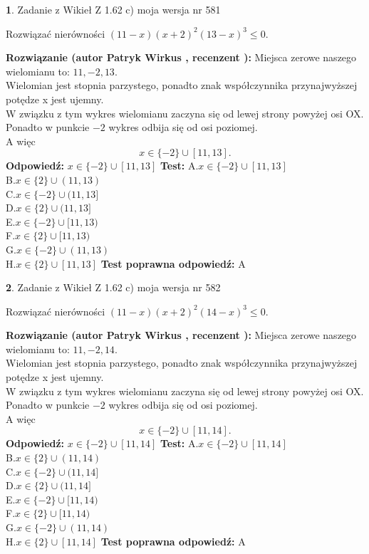 \documentclass[12pt, a4paper]{article}
\theoremstyle{definition} %
\newtheorem{zad}{}
\newcommand{\zadStart}[1]{\begin{zad}#1\newline}
\newcommand{\zadStop}{\end{zad}}
\newcommand{\rozwStart}[2]{\noindent \textbf{Rozwiązanie (autor #1 , recenzent #2): }\newline}
\newcommand{\rozwStop}{\newline}
\newcommand{\odpStart}{\noindent \textbf{Odpowiedź:}\newline}
\newcommand{\odpStop}{\newline}
\newcommand{\testStart}{\noindent \textbf{Test:}\newline}
\newcommand{\testStop}{\newline}
\newcommand{\kluczStart}{\noindent \textbf{Test poprawna odpowiedź:}\newline}
\newcommand{\kluczStop}{\newline}
\begin{document}
\zadStart{Zadanie z Wikieł Z 1.62 c) moja wersja nr 581}

Rozwiązać nierówności $(11-x)(x+2)^{2}(13-x)^{3}\le0$.
\zadStop
\rozwStart{Patryk Wirkus}{}
Miejsca zerowe naszego wielomianu to: $11, -2, 13$.\\
Wielomian jest stopnia parzystego, ponadto znak współczynnika przy\linebreak najwyższej potędze x jest ujemny.\\ W związku z tym wykres wielomianu zaczyna się od lewej strony powyżej osi OX.\\
Ponadto w punkcie $-2$ wykres odbija się od osi poziomej.\\
A więc $$x \in \{-2\} \cup [11,13].$$
\rozwStop
\odpStart
$x \in \{-2\} \cup [11,13]$
\odpStop
\testStart
A.$x \in \{-2\} \cup [11,13]$\\
B.$x \in \{2\} \cup (11,13)$\\
C.$x \in \{-2\} \cup (11,13]$\\
D.$x \in \{2\} \cup (11,13]$\\
E.$x \in \{-2\} \cup [11,13)$\\
F.$x \in \{2\} \cup [11,13)$\\
G.$x \in \{-2\} \cup (11,13)$\\
H.$x \in \{2\} \cup [11,13]$
\testStop
\kluczStart
A
\kluczStop



\zadStart{Zadanie z Wikieł Z 1.62 c) moja wersja nr 582}

Rozwiązać nierówności $(11-x)(x+2)^{2}(14-x)^{3}\le0$.
\zadStop
\rozwStart{Patryk Wirkus}{}
Miejsca zerowe naszego wielomianu to: $11, -2, 14$.\\
Wielomian jest stopnia parzystego, ponadto znak współczynnika przy\linebreak najwyższej potędze x jest ujemny.\\ W związku z tym wykres wielomianu zaczyna się od lewej strony powyżej osi OX.\\
Ponadto w punkcie $-2$ wykres odbija się od osi poziomej.\\
A więc $$x \in \{-2\} \cup [11,14].$$
\rozwStop
\odpStart
$x \in \{-2\} \cup [11,14]$
\odpStop
\testStart
A.$x \in \{-2\} \cup [11,14]$\\
B.$x \in \{2\} \cup (11,14)$\\
C.$x \in \{-2\} \cup (11,14]$\\
D.$x \in \{2\} \cup (11,14]$\\
E.$x \in \{-2\} \cup [11,14)$\\
F.$x \in \{2\} \cup [11,14)$\\
G.$x \in \{-2\} \cup (11,14)$\\
H.$x \in \{2\} \cup [11,14]$
\testStop
\kluczStart
A
\kluczStop
\end{document}
